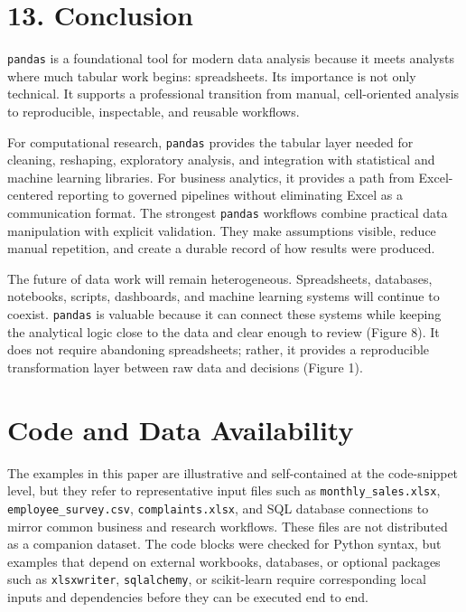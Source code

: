 \documentclass[
  12pt,
]{article}
\begin{document}
\section{13. Conclusion}\label{conclusion}

\texttt{pandas} is a foundational tool for modern data analysis because
it meets analysts where much tabular work begins: spreadsheets. Its
importance is not only technical. It supports a professional transition
from manual, cell-oriented analysis to reproducible, inspectable, and
reusable workflows.

For computational research, \texttt{pandas} provides the tabular layer
needed for cleaning, reshaping, exploratory analysis, and integration
with statistical and machine learning libraries. For business analytics,
it provides a path from Excel-centered reporting to governed pipelines
without eliminating Excel as a communication format. The strongest
\texttt{pandas} workflows combine practical data manipulation with
explicit validation. They make assumptions visible, reduce manual
repetition, and create a durable record of how results were produced.

The future of data work will remain heterogeneous. Spreadsheets,
databases, notebooks, scripts, dashboards, and machine learning systems
will continue to coexist. \texttt{pandas} is valuable because it can
connect these systems while keeping the analytical logic close to the
data and clear enough to review (Figure 8). It does not require
abandoning spreadsheets; rather, it provides a reproducible
transformation layer between raw data and decisions (Figure 1).

\section{Code and Data Availability}\label{code-and-data-availability}

The examples in this paper are illustrative and self-contained at the
code-snippet level, but they refer to representative input files such as
\texttt{monthly\_sales.xlsx}, \texttt{employee\_survey.csv},
\texttt{complaints.xlsx}, and SQL database connections to mirror common
business and research workflows. These files are not distributed as a
companion dataset. The code blocks were checked for Python syntax, but
examples that depend on external workbooks, databases, or optional
packages such as \texttt{xlsxwriter}, \texttt{sqlalchemy}, or
scikit-learn require corresponding local inputs and dependencies before
they can be executed end to end.
\end{document}
